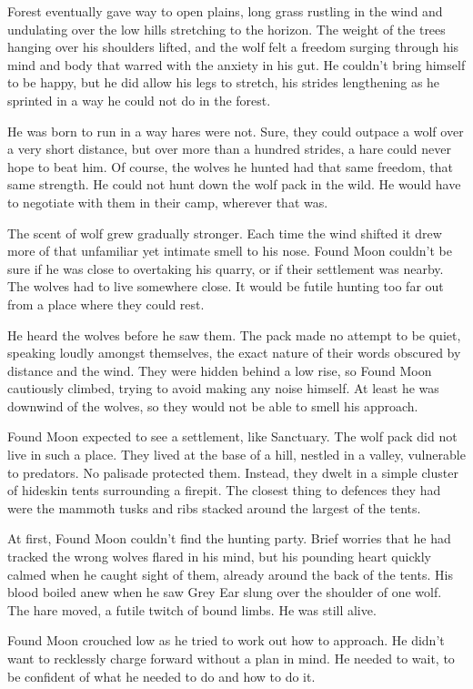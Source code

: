 Forest eventually gave way to open plains, long grass rustling in the wind and undulating over the low hills stretching to the horizon. The weight of the trees hanging over his shoulders lifted, and the wolf felt a freedom surging through his mind and body that warred with the anxiety in his gut. He couldn't bring himself to be happy, but he did allow his legs to stretch, his strides lengthening as he sprinted in a way he could not do in the forest.

He was born to run in a way hares were not. Sure, they could outpace a wolf over a very short distance, but over more than a hundred strides, a hare could never hope to beat him. Of course, the wolves he hunted had that same freedom, that same strength. He could not hunt down the wolf pack in the wild. He would have to negotiate with them in their camp, wherever that was.

The scent of wolf grew gradually stronger. Each time the wind shifted it drew more of that unfamiliar yet intimate smell to his nose. Found Moon couldn't be sure if he was close to overtaking his quarry, or if their settlement was nearby. The wolves had to live somewhere close. It would be futile hunting too far out from a place where they could rest.

He heard the wolves before he saw them. The pack made no attempt to be quiet, speaking loudly amongst themselves, the exact nature of their words obscured by distance and the wind. They were hidden behind a low rise, so Found Moon cautiously climbed, trying to avoid making any noise himself. At least he was downwind of the wolves, so they would not be able to smell his approach.

Found Moon expected to see a settlement, like Sanctuary. The wolf pack did not live in such a place. They lived at the base of a hill, nestled in a valley, vulnerable to predators. No palisade protected them. Instead, they dwelt in a simple cluster of hideskin tents surrounding a firepit. The closest thing to defences they had were the mammoth tusks and ribs stacked around the largest of the tents.

At first, Found Moon couldn't find the hunting party. Brief worries that he had tracked the wrong wolves flared in his mind, but his pounding heart quickly calmed when he caught sight of them, already around the back of the tents. His blood boiled anew when he saw Grey Ear slung over the shoulder of one wolf. The hare moved, a futile twitch of bound limbs. He was still alive.

Found Moon crouched low as he tried to work out how to approach. He didn't want to recklessly charge forward without a plan in mind. He needed to wait, to be confident of what he needed to do and how to do it.

